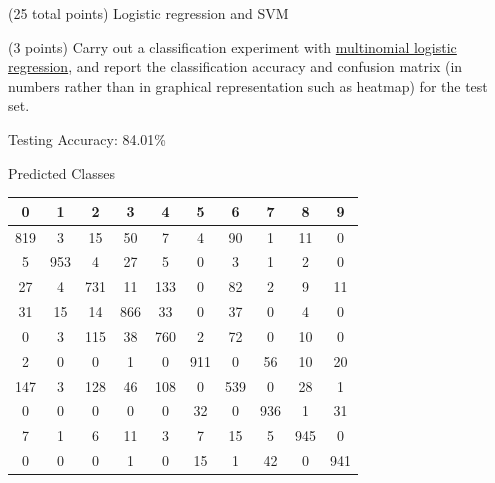 \documentclass[12pt]{article}
\begin{document}
\begin{question}{(25 total points) Logistic regression and SVM}

  


  \medskip
   \begin{subquestion}{(3 points)
       Carry out a classification experiment with
       \href{https://scikit-learn.org/0.19/modules/generated/sklearn.linear\_model.LogisticRegression.html}{multinomial logistic regression},
       and report the classification accuracy and confusion matrix (in
       numbers rather than in graphical representation such as heatmap)
       for the test set.
     } \label{Q2.1}


   

    \begin{answerbox}{30em}
    Testing Accuracy: 84.01\%\newline
    \newline
    \centerline{Predicted Classes}
    \begin{center}
    \begin{tabular}{c|c|c|c|c|c|c|c|c|c}
    \hline
    \multicolumn{1}{c}{\bfseries 0} & \multicolumn{1}{c}{\bfseries 1} & \multicolumn{1}{c}{\bfseries 2} & \multicolumn{1}{c}{\bfseries 3} &
    \multicolumn{1}{c}{\bfseries 4} & \multicolumn{1}{c}{\bfseries 5} &
    \multicolumn{1}{c}{\bfseries 6} & \multicolumn{1}{c}{\bfseries 7} &
    \multicolumn{1}{c}{\bfseries 8} & \multicolumn{1}{c}{\bfseries 9} \\ \hline
    819 & 3   & 15  & 50  & 7   & 4   & 90  & 1   & 11  & 0   \\ 
    5      & 953 & 4   & 27  & 5   & 0   & 3   & 1   & 2   & 0   \\ 
    27     & 4   & 731 & 11  & 133 & 0   & 82  & 2   & 9   & 11  \\ 
    31     & 15  & 14  & 866 & 33  & 0   & 37  & 0   & 4   & 0   \\ 
    0      & 3   & 115 & 38  & 760 & 2   & 72  & 0   & 10  & 0   \\ 
    2      & 0   & 0   & 1   & 0   & 911 & 0   & 56  & 10  & 20  \\ 
    147    & 3   & 128 & 46  & 108 & 0   & 539 & 0   & 28  & 1   \\ 
    0      & 0   & 0   & 0   & 0   & 32  & 0   & 936 & 1   & 31  \\ 
    7      & 1   & 6   & 11  & 3   & 7   & 15  & 5   & 945 & 0   \\ 
    0      & 0   & 0   & 1   & 0   & 15  & 1   & 42  & 0   & 941 \\ 
    \hline
    \end{tabular}
    \end{center}          
    

\end{answerbox}
\end{subquestion}
\end{question}
\end{document}
